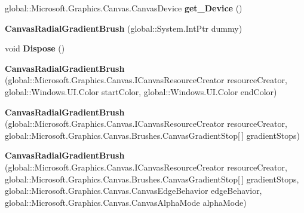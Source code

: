 \begin{DoxyCompactItemize}
global\+::\+Microsoft.\+Graphics.\+Canvas.\+Canvas\+Device {\bfseries get\+\_\+\+Device} ()
\item 
\mbox{\label{class_microsoft_1_1_graphics_1_1_canvas_1_1_brushes_1_1_canvas_radial_gradient_brush_ad4094bf0b0928b39a9f4e4e479112201}} 
{\bfseries Canvas\+Radial\+Gradient\+Brush} (global\+::\+System.\+Int\+Ptr dummy)
\item 
\mbox{\label{class_microsoft_1_1_graphics_1_1_canvas_1_1_brushes_1_1_canvas_radial_gradient_brush_a7aea17ea64376e07a9c103770bcdbe55}} 
void {\bfseries Dispose} ()
\item 
\mbox{\label{class_microsoft_1_1_graphics_1_1_canvas_1_1_brushes_1_1_canvas_radial_gradient_brush_a63863bff18c4d0e79ecfc400e0f0752f}} 
{\bfseries Canvas\+Radial\+Gradient\+Brush} (global\+::\+Microsoft.\+Graphics.\+Canvas.\+I\+Canvas\+Resource\+Creator resource\+Creator, global\+::\+Windows.\+U\+I.\+Color start\+Color, global\+::\+Windows.\+U\+I.\+Color end\+Color)
\item 
\mbox{\label{class_microsoft_1_1_graphics_1_1_canvas_1_1_brushes_1_1_canvas_radial_gradient_brush_aa2c2fd59d76619f8d908b988059d5e2c}} 
{\bfseries Canvas\+Radial\+Gradient\+Brush} (global\+::\+Microsoft.\+Graphics.\+Canvas.\+I\+Canvas\+Resource\+Creator resource\+Creator, global\+::\+Microsoft.\+Graphics.\+Canvas.\+Brushes.\+Canvas\+Gradient\+Stop\mbox{[}$\,$\mbox{]} gradient\+Stops)
\item 
\mbox{\label{class_microsoft_1_1_graphics_1_1_canvas_1_1_brushes_1_1_canvas_radial_gradient_brush_a72a997087b68baa682963acf4c7547b0}} 
{\bfseries Canvas\+Radial\+Gradient\+Brush} (global\+::\+Microsoft.\+Graphics.\+Canvas.\+I\+Canvas\+Resource\+Creator resource\+Creator, global\+::\+Microsoft.\+Graphics.\+Canvas.\+Brushes.\+Canvas\+Gradient\+Stop\mbox{[}$\,$\mbox{]} gradient\+Stops, global\+::\+Microsoft.\+Graphics.\+Canvas.\+Canvas\+Edge\+Behavior edge\+Behavior, global\+::\+Microsoft.\+Graphics.\+Canvas.\+Canvas\+Alpha\+Mode alpha\+Mode)

\end{DoxyCompactItemize}
